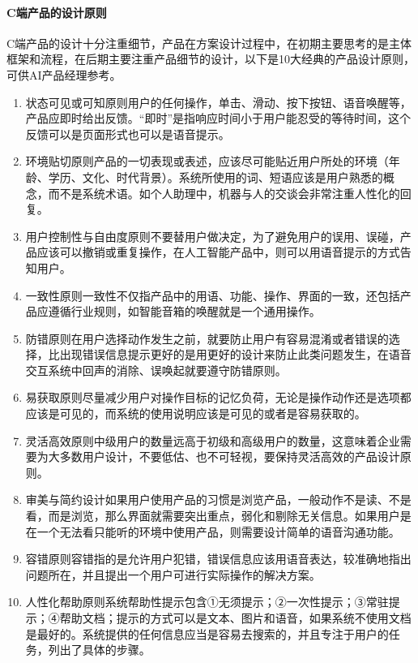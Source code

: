 \documentclass[letterpaper,11pt,english]{sphinxmanual}
\begin{document}
\paragraph{C端产品的设计原则}
\label{\detokenize{chapter_introduction/2C:c}}
C端产品的设计十分注重细节，产品在方案设计过程中，在初期主要思考的是主体框架和流程，在后期主要注重产品细节的设计，以下是10大经典的产品设计原则，可供AI产品经理参考。
\begin{enumerate}
%
\item {} 
状态可见或可知原则用户的任何操作，单击、滑动、按下按钮、语音唤醒等，产品应即时给出反馈。“即时”是指响应时间小于用户能忍受的等待时间，这个反馈可以是页面形式也可以是语音提示。

\item {} 
环境贴切原则产品的一切表现或表述，应该尽可能贴近用户所处的环境（年龄、学历、文化、时代背景）。系统所使用的词、短语应该是用户熟悉的概念，而不是系统术语。如个人助理中，机器与人的交谈会非常注重人性化的回复。

\item {} 
用户控制性与自由度原则不要替用户做决定，为了避免用户的误用、误碰，产品应该可以撤销或重复操作，在人工智能产品中，则可以用语音提示的方式告知用户。

\item {} 
一致性原则一致性不仅指产品中的用语、功能、操作、界面的一致，还包括产品应遵循行业规则，如智能音箱的唤醒就是一个通用操作。

\item {} 
防错原则在用户选择动作发生之前，就要防止用户有容易混淆或者错误的选择，比出现错误信息提示更好的是用更好的设计来防止此类问题发生，在语音交互系统中回声的消除、误唤起就要遵守防错原则。

\item {} 
易获取原则尽量减少用户对操作目标的记忆负荷，无论是操作动作还是选项都应该是可见的，而系统的使用说明应该是可见的或者是容易获取的。

\item {} 
灵活高效原则中级用户的数量远高于初级和高级用户的数量，这意味着企业需要为大多数用户设计，不要低估、也不可轻视，要保持灵活高效的产品设计原则。

\item {} 
审美与简约设计如果用户使用产品的习惯是浏览产品，一般动作不是读、不是看，而是浏览，那么界面就需要突出重点，弱化和剔除无关信息。如果用户是在一个无法看只能听的环境中使用产品，则需要设计简单的语音沟通功能。

\item {} 
容错原则容错指的是允许用户犯错，错误信息应该用语音表达，较准确地指出问题所在，并且提出一个用户可进行实际操作的解决方案。

\item {} 
人性化帮助原则系统帮助性提示包含①无须提示；②一次性提示；③常驻提示；④帮助文档；提示的方式可以是文本、图片和语音，如果系统不使用文档是最好的。系统提供的任何信息应当是容易去搜索的，并且专注于用户的任务，列出了具体的步骤。

\end{enumerate}
\end{document}
